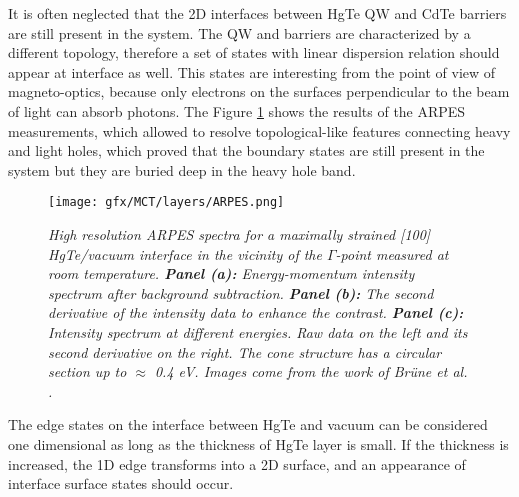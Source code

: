 \documentclass[titlepage,a4paper]{book}
\begin{document}
It is often neglected that the 2D interfaces between HgTe QW and CdTe barriers are still present in the system. The QW and barriers are characterized by a different topology, therefore a set of states with linear dispersion relation should appear at interface as well. This states are interesting from the point of view of magneto-optics, because only electrons on the surfaces perpendicular to the beam of light can absorb photons. The Figure \ref{fig:Layers_ARPES} shows the results of the ARPES measurements, which allowed to resolve topological-like features connecting heavy and light holes, which proved that the boundary states are still present in the system but they are buried deep in the heavy hole band. 

\begin{figure}[ht]
	\centering
	\texttt{[image: gfx/MCT/layers/ARPES.png]}
	\vspace{-10pt}
	\caption{\textit{High resolution ARPES spectra for a maximally strained [100] HgTe/vacuum interface in the vicinity of the $\Gamma$-point measured at room temperature. \textbf{Panel (a):} Energy-momentum intensity spectrum after background subtraction. \textbf{Panel (b):} The second derivative of the intensity data to enhance the contrast. \textbf{Panel (c):} Intensity spectrum at different energies. Raw data on the left and its second derivative on the right. The cone structure has a circular section up to $\approx$ 0.4 eV. Images come from the work of Brüne \textit{et al.} \cite{Brune_State2}.}}
	\label{fig:Layers_ARPES}
\end{figure} 

The edge states on the interface between HgTe and vacuum can be considered one dimensional as long as the thickness of HgTe layer is small. If the thickness is increased, the 1D edge transforms into a 2D surface, and an appearance of interface surface states should occur.
\end{document}
